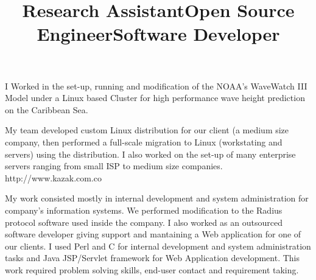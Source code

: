 \begin{resume}
\title{\textbf{Research Assistant}}
\begin{position}
I Worked in the set-up, running and modification of the NOAA's WaveWatch III Model under a Linux based Cluster
for high performance wave height prediction on the Caribbean Sea.
\end{position}


\title{\textbf{Open Source Engineer}}
\begin{position}
My team developed custom  Linux distribution for our client (a medium
size company, then performed a full-scale migration to Linux
(workstating and servers) using the distribution. I also worked on  the set-up of many enterprise
servers ranging from small ISP to medium size companies. 
http://www.kazak.com.co
\end{position}
\newline
\newline
\newline
\newline
\newline



\title{\textbf{Software Developer}}
\begin{position}
My work consisted mostly  in internal development and system
 administration   for  company's information systems.
We performed modification to the Radius protocol software used inside the company.
I also worked as an outsourced software developer giving support and
 mantaining  a Web application for one of our clients.  I used Perl and C for internal
development and  system administration tasks and Java JSP/Servlet
framework for Web Application development. This work required problem
 solving skills, end-user contact and requirement taking.
\end{position}



\end{resume}
